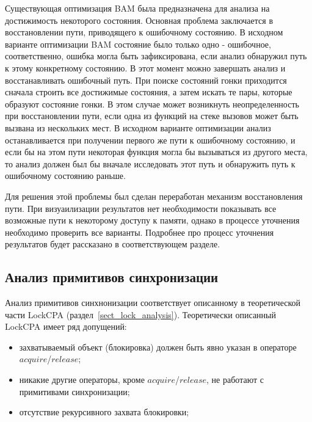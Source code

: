 Существующая оптимизация BAM была предназначена для анализа на достижимость некоторого состояния.
Основная проблема заключается в восстановлении пути, приводящего к ошибочному состоянию.
В исходном варианте оптимизации BAM состояние было только одно - ошибочное, соответственно, ошибка могла быть зафиксирована, если анализ обнаружил путь к этому конкретному состоянию.
В этот момент можно завершать анализ и восстанавливать ошибочный путь.
При поиске состояний гонки приходится сначала строить все достижимые состояния, а затем искать те пары, которые образуют состояние гонки.
В этом случае может возникнуть неопределенность при восстановлении пути, если одна из функций на стеке вызовов может быть вызвана из нескольких мест.
В исходном варианте оптимизации анализ останавливается при получении первого же пути к ошибочному состоянию, и если бы на этом пути некоторая функция могла бы вызываться из другого места, то анализ должен был бы вначале исследовать этот путь и обнаружить путь к ошибочному состоянию раньше.

Для решения этой проблемы был сделан переработан механизм восстановления пути. 
При визуаилизации результатов нет необходимости показывать все возможные пути к некоторому доступу к памяти, однако в процессе уточнения необходимо проверить все варианты.
Подробнее про процесс уточнения результатов будет рассказано в соответствующем разделе.

\subsection{Анализ примитивов синхронизации}
Анализ примитивов синхнонизации соответствует описанному в теоретической части LockCPA (раздел~\ref{sect_lock_analysis}).
Теоретически описанный LockCPA имеет ряд допущений:
\begin{itemize}
\item захватываемый объект (блокировка) должен быть явно указан в операторе $acquire$/$release$;
\item никакие другие операторы, кроме $acquire$/$release$, не работают с примитивами синхронизации;
\item отсутствие рекурсивного захвата блокировки;
\end{itemize}

